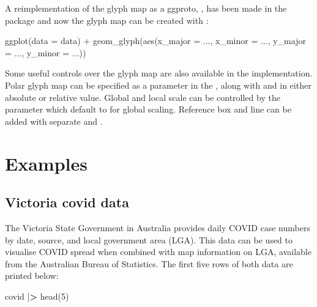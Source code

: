 \documentclass{article}
\newenvironment{Shaded}{\begin{snugshade}}{\end{snugshade}}
\newcommand{\AttributeTok}[1]{\textcolor[rgb]{0.77,0.63,0.00}{#1}}
\newcommand{\DecValTok}[1]{\textcolor[rgb]{0.00,0.00,0.81}{#1}}
\newcommand{\ErrorTok}[1]{\textcolor[rgb]{0.64,0.00,0.00}{\textbf{#1}}}
\newcommand{\FunctionTok}[1]{\textcolor[rgb]{0.00,0.00,0.00}{#1}}
\newcommand{\NormalTok}[1]{#1}
\newcommand{\SpecialCharTok}[1]{\textcolor[rgb]{0.00,0.00,0.00}{#1}}
\begin{document}
A reimplementation of the glyph map as a ggproto, , has been made in the  package and now the glyph map can be created with :

\begin{Shaded}
\begin{Highlighting}[]
\FunctionTok{ggplot}\NormalTok{(}\AttributeTok{data =}\NormalTok{ data) }\SpecialCharTok{+}
  \FunctionTok{geom\_glyph}\NormalTok{(}\FunctionTok{aes}\NormalTok{(}\AttributeTok{x\_major =}\NormalTok{ ..., }\AttributeTok{x\_minor =}\NormalTok{ ...,}
                 \AttributeTok{y\_major =}\NormalTok{ ..., }\AttributeTok{y\_minor =}\NormalTok{ ...))}
\end{Highlighting}
\end{Shaded}

Some useful controls over the glyph map are also available in the  implementation. Polar glyph map can be specified as a parameter  in the , along with  and  in either absolute or relative value. Global and local scale can be controlled by the parameter  which default to  for global scaling. Reference box and line can be added with separate  and .

\hypertarget{examples}{%
\section{Examples}\label{examples}}

\hypertarget{covid}{%
\subsection{Victoria covid data}\label{covid}}

The Victoria State Government in Australia provides daily COVID case numbers by date, source, and local government area (LGA). This data can be used to visualise COVID spread when combined with map information on LGA, available from the Australian Bureau of Statistics. The first five rows of both data are printed below:

\begin{Shaded}
\begin{Highlighting}[]
\NormalTok{covid }\SpecialCharTok{|}\ErrorTok{\textgreater{}} \FunctionTok{head}\NormalTok{(}\DecValTok{5}\NormalTok{)}
\end{Highlighting}
\end{Shaded}
\end{document}
